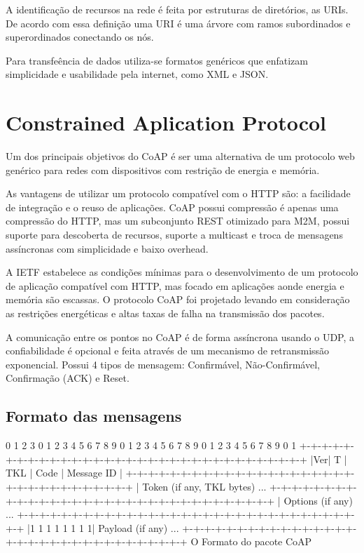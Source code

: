 A identifica\c{c}\~ao de recursos na rede \'e feita por estruturas de diret\'orios, as URIs. De acordo com essa defini\c{c}\~ao uma URI \'e uma \'arvore com ramos subordinados e superordinados conectando os nós.

Para transfe\^encia de dados utiliza-se formatos gen\'ericos que enfatizam simplicidade e usabilidade pela internet, como XML e JSON.

\section{Constrained Aplication Protocol}

Um dos principais objetivos do CoAP \'e ser uma alternativa de um protocolo web gen\'erico para redes com dispositivos com restri\c{c}\~ao de energia e mem\'oria.

As vantagens de utilizar um protocolo compat\'ivel com o HTTP s\~ao: a facilidade de integra\c{c}\~ao e o reuso de aplica\c{c}\~oes. CoAP possui compress\~ao \'e apenas uma compress\~ao do HTTP, mas um subconjunto REST otimizado para M2M, possui suporte para descoberta de recursos, suporte a multicast e troca de mensagens ass\'incronas com simplicidade e baixo overhead.

A IETF estabelece as condi\c{c}\~oes m\'inimas para o desenvolvimento de um protocolo de aplica\c{c}\~ao compat\'ivel com HTTP, mas focado em aplica\c{c}\~oes aonde energia e mem\'oria s\~ao escassas. O protocolo CoAP foi projetado levando em considera\c{c}\~ao as restri\c{c}\~oes energ\'eticas e altas taxas de falha na transmiss\~ao dos pacotes.

A comunica\c{c}\~ao entre os pontos no CoAP \'e de forma ass\'incrona usando o UDP, a confiabilidade \'e opcional e feita atrav\'es de um mecanismo de retransmiss\~ao exponencial. Possui 4 tipos de mensagem: Confirm\'avel, N\~ao-Confirm\'avel, Confirma\c{c}\~ao (ACK) e Reset.

\subsection{Formato das mensagens}

     0                   1                   2                   3
    0 1 2 3 4 5 6 7 8 9 0 1 2 3 4 5 6 7 8 9 0 1 2 3 4 5 6 7 8 9 0 1
   +-+-+-+-+-+-+-+-+-+-+-+-+-+-+-+-+-+-+-+-+-+-+-+-+-+-+-+-+-+-+-+-+
   |Ver| T |  TKL  |      Code     |          Message ID           |
   +-+-+-+-+-+-+-+-+-+-+-+-+-+-+-+-+-+-+-+-+-+-+-+-+-+-+-+-+-+-+-+-+
   |   Token (if any, TKL bytes) ...
   +-+-+-+-+-+-+-+-+-+-+-+-+-+-+-+-+-+-+-+-+-+-+-+-+-+-+-+-+-+-+-+-+
   |   Options (if any) ...
   +-+-+-+-+-+-+-+-+-+-+-+-+-+-+-+-+-+-+-+-+-+-+-+-+-+-+-+-+-+-+-+-+
   |1 1 1 1 1 1 1 1|    Payload (if any) ...
   +-+-+-+-+-+-+-+-+-+-+-+-+-+-+-+-+-+-+-+-+-+-+-+-+-+-+-+-+-+-+-+-+
   O Formato do pacote CoAP  \cite{draft-ietf-core-coap-18}



